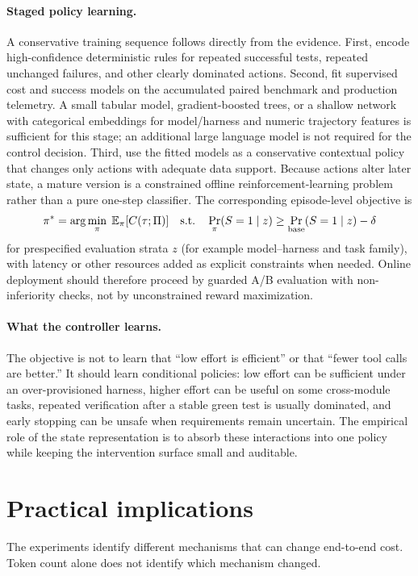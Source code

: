 \documentclass[11pt]{article}
\begin{document}
\paragraph{Staged policy learning.}
A conservative training sequence follows directly from the evidence. First,
encode high-confidence deterministic rules for repeated successful tests,
repeated unchanged failures, and other clearly dominated actions. Second, fit
supervised cost and success models on the accumulated paired benchmark and
production telemetry. A small tabular model, gradient-boosted trees, or a
shallow network with categorical embeddings for model/harness and numeric
trajectory features is sufficient for this stage; an additional large language
model is not required for the control decision. Third, use the fitted models as
a conservative contextual policy that changes only actions with adequate data
support. Because actions alter later state, a mature version is a constrained
offline reinforcement-learning problem rather than a pure one-step classifier.
The corresponding episode-level objective is
\[
\pi^*=\arg\min_{\pi}\;\mathbb{E}_{\pi}[C(\tau;\Pi)]
\quad\text{s.t.}\quad
\Pr_{\pi}(S=1\mid z)\geq
\Pr_{\rm base}(S=1\mid z)-\delta
\]
for prespecified evaluation strata $z$ (for example model--harness and task
family), with latency or other resources added as explicit constraints when
needed. Online deployment should therefore proceed by guarded A/B evaluation
with non-inferiority checks, not by unconstrained reward maximization.

\paragraph{What the controller learns.}
The objective is not to learn that ``low effort is efficient'' or that ``fewer
tool calls are better.'' It should learn conditional policies: low effort can
be sufficient under an over-provisioned harness, higher effort can be useful on
some cross-module tasks, repeated verification after a stable green test is
usually dominated, and early stopping can be unsafe when requirements remain
uncertain. The empirical role of the state representation is to absorb these
interactions into one policy while keeping the intervention surface small and
auditable.

\section{Practical implications}
\label{sec:implications}
The experiments identify different mechanisms that can change end-to-end cost.
Token count alone does not identify which mechanism changed.
\end{document}
